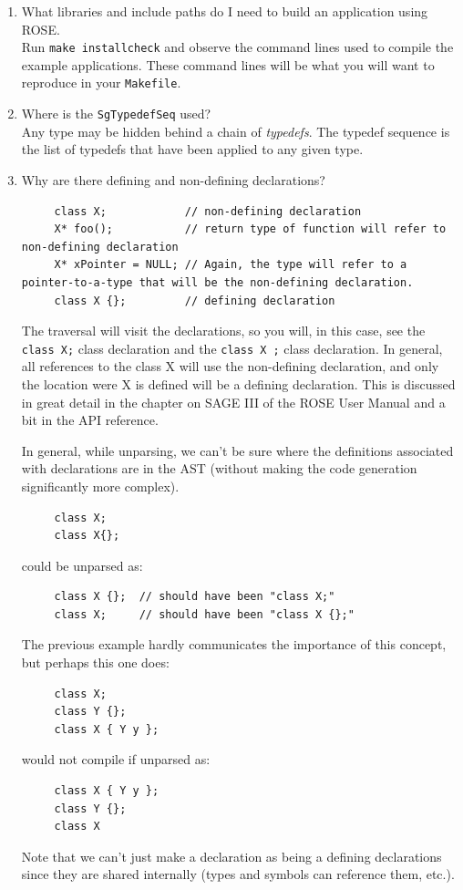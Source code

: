 \begin{enumerate}
\item What libraries and include paths do I need to build an application using ROSE. \\
      Run {\tt make installcheck} and observe the command lines used to
      compile the example applications.  These command lines will be what you will
      want to reproduce in your {\tt Makefile}.

\item Where is the {\tt SgTypedefSeq} used? \\
    Any type may be hidden behind a chain of {\em typedefs}. The typedef sequence is the
    list of typedefs that have been applied to any given type.

\item Why are there defining and non-defining declarations? \\

{\indent
{\mySmallFontSize
\begin{verbatim}
     class X;            // non-defining declaration
     X* foo();           // return type of function will refer to non-defining declaration
     X* xPointer = NULL; // Again, the type will refer to a pointer-to-a-type that will be the non-defining declaration.
     class X {};         // defining declaration
\end{verbatim}
}}

The traversal will visit the declarations, so you will, in this case, see the {\tt class X;}
class declaration and the {\tt class X {};} class declaration.  In general, all references to
the class X will use the non-defining declaration, and only the location were X is defined
will be a defining declaration.  This is discussed in great detail in the chapter on SAGE III of 
the ROSE User Manual and a bit in the API reference.

In general, while unparsing, we can't be sure where the definitions associated with
declarations are in the AST (without making the code generation significantly more
complex).
{\indent
{\mySmallFontSize
\begin{verbatim}
     class X;
     class X{};
\end{verbatim}
}}
could be unparsed as:
{\indent
{\mySmallFontSize
\begin{verbatim}
     class X {};  // should have been "class X;"
     class X;     // should have been "class X {};"
\end{verbatim}
}}
The previous example hardly communicates the importance of this concept, but perhaps this
one does:
{\indent
{\mySmallFontSize
\begin{verbatim}
     class X;
     class Y {};
     class X { Y y };
\end{verbatim}
}}
would not compile if unparsed as:
{\indent
{\mySmallFontSize
\begin{verbatim}
     class X { Y y };
     class Y {};
     class X
\end{verbatim}
}}
Note that we can't just make a declaration as being a defining declarations since they are
shared internally (types and symbols can reference them, etc.).




\end{enumerate}

